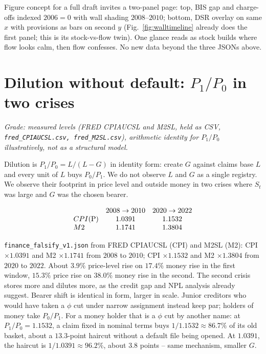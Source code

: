 Figure concept for a full draft invites a two-panel page: top, BIS gap and charge-offs indexed $2006=0$ with wall shading $2008$--$2010$; bottom, DSR overlay on same $x$ with provisions as bars on second $y$ (Fig.~\ref{fig:walltimeline} already does the first panel; this is its stock-vs-flow twin). One glance reads as stock builds where flow looks calm, then flow confesses. No new data beyond the three JSONs above.

\section{Dilution without default: $P_1/P_0$ in two crises}
\label{sec:dilution}

\textit{Grade: measured levels (FRED CPIAUCSL and M2SL, held as CSV, \texttt{fred\_CPIAUCSL.csv, fred\_M2SL.csv}), arithmetic identity for $P_1/P_0$ illustratively, not as a structural model.}

Dilution is $P_1/P_0 = L/(L-G)$ in identity form: create $G$ against claims base $L$ and every unit of $L$ buys $P_0/P_1$. We do not observe $L$ and $G$ as a single registry. We observe their footprint in price level and outside money in two crises where $S_t$ was large and $G$ was the chosen bearer.

\[
\begin{array}{lcc}
 & 2008\to2010 & 2020\to2022 \\
CPI ($P$) & 1.0391 & 1.1532 \\
M2 & 1.1741 & 1.3804 \\
\end{array}
\]

\texttt{finance\_falsify\_v1.json} from FRED CPIAUCSL (CPI) and M2SL (M2): CPI $\times1.0391$ and M2 $\times1.1741$ from $2008$ to $2010$; CPI $\times1.1532$ and M2 $\times1.3804$ from $2020$ to $2022$. About $3.9\%$ price-level rise on $17.4\%$ money rise in the first window, $15.3\%$ price rise on $38.0\%$ money rise in the second. The second crisis stores more and dilutes more, as the credit gap and NPL analysis already suggest. Bearer shift is identical in form, larger in scale. Junior creditors who would have taken a $\phi$ cut under narrow assignment instead keep par; holders of money take $P_0/P_1$. For a money holder that is a $\phi$ cut by another name: at $P_1/P_0=1.1532$, a claim fixed in nominal terms buys $1/1.1532\approx86.7\%$ of its old basket, about a $13.3$-point haircut without a default file being opened. At $1.0391$, the haircut is $1/1.0391\approx96.2\%$, about $3.8$ points -- same mechanism, smaller $G$.

